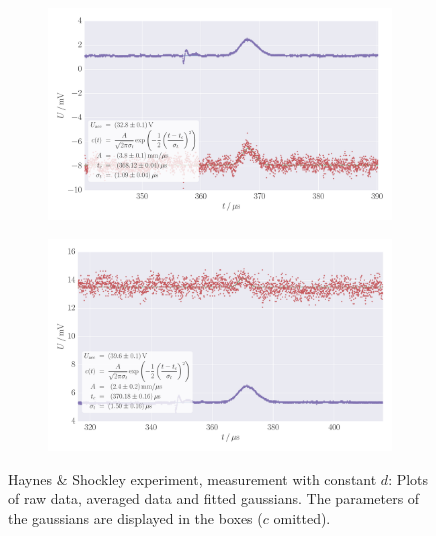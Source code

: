 \begin{figure}
    \centering
    \begin{subfigure}[b]{\pltw}
        \includegraphics[width=1.0\linewidth]{figures/haynes_shockley_raw_U_61}
        \caption{}
        \label{fig:h_s_raw_U_61}
    \end{subfigure}
    \begin{subfigure}[b]{\pltw}
        \includegraphics[width=1.0\linewidth]{figures/haynes_shockley_raw_U_47}
        \caption{}
        \label{fig:h_s_raw_U_47}
    \end{subfigure}
    \caption{
        Haynes \& Shockley experiment, measurement with constant $d$:
        Plots of raw data, averaged data and fitted gaussians. 
        The parameters of the gaussians are displayed in the boxes 
        ($c$ omitted).
        }
    \label{fig:h_s_raw_plots_U_61_47}
\end{figure}
